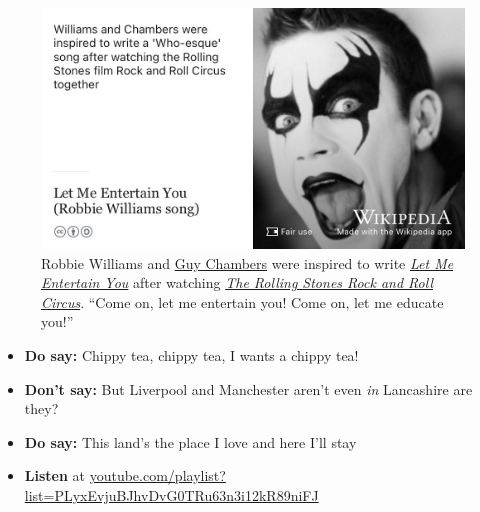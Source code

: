\documentclass[
]{book}
\providecommand{\tightlist}{%
  \setlength{\itemsep}{0pt}\setlength{\parskip}{0pt}}
\begin{document}
\begin{figure}
\includegraphics[width=0.99\linewidth]{images/let-me-entertain-you-let-me-educate-you} \caption{Robbie Williams and \href{https://en.wikipedia.org/wiki/Guy_Chambers}{Guy Chambers} were inspired to write \emph{\href{https://en.wikipedia.org/wiki/Let_Me_Entertain_You_(Robbie_Williams_song)}{Let Me Entertain You}} after watching \emph{\href{https://en.wikipedia.org/wiki/The_Rolling_Stones_Rock_and_Roll_Circus}{The Rolling Stones Rock and Roll Circus}}. \citep{circus} ``Come on, let me entertain you! Come on, let me educate you!'' \citep{entertainyou}}\label{fig:robbie-williams-fig}
\end{figure}



\begin{itemize}
\tightlist
\item
  \textbf{Do say:} Chippy tea, chippy tea, I wants a chippy tea! \citep{chippytea, chippywhat}
\item
  \textbf{Don't say:} But Liverpool and Manchester aren't even \emph{in} Lancashire are they? \citep{mancashire}
\item
  \textbf{Do say:} This land's the place I love and here I'll stay \citep{ferrycrossthemersey}
\item
  \textbf{Listen} at \href{https://youtube.com/playlist?list=PLyxEvjuBJhvDvG0TRu63n3i12kR89niFJ}{youtube.com/playlist?list=PLyxEvjuBJhvDvG0TRu63n3i12kR89niFJ}
\end{itemize}
\end{document}
